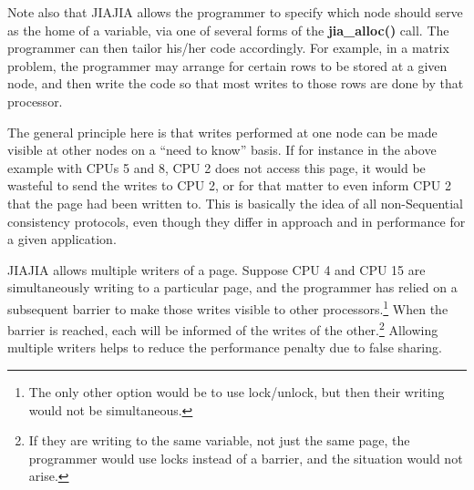 Note also that JIAJIA allows the programmer to specify which node should
serve as the home of a variable, via one of several forms of the {\bf
jia\_alloc()} call.  The programmer can then tailor his/her code
accordingly.  For example, in a matrix problem, the programmer may
arrange for certain rows to be stored at a given node, and then write
the code so that most writes to those rows are done by that processor.

The general principle here is that writes performed at one node can be
made visible at other nodes on a ``need to know'' basis.  If for
instance in the above example with CPUs 5 and 8, CPU 2 does not access
this page, it would be wasteful to send the writes to CPU 2, or for that
matter to even inform CPU 2 that the page had been written to.  This is
basically the idea of all non-Sequential consistency protocols, even
though they differ in approach and in performance for a given
application.

JIAJIA allows multiple writers of a page.  Suppose CPU 4 and CPU 15 are
simultaneously writing to a particular page, and the programmer has
relied on a subsequent barrier to make those writes visible to other
processors.\footnote{The only other option would be to use lock/unlock,
but then their writing would not be simultaneous.}  When the barrier is
reached, each will be informed of the writes of the other.\footnote{If
they are writing to the same variable, not just the same page, the
programmer would use locks instead of a barrier, and the situation would
not arise.}  Allowing multiple writers helps to reduce the performance
penalty due to false sharing.

%
%
%
%
%
%
%
%
%
%

